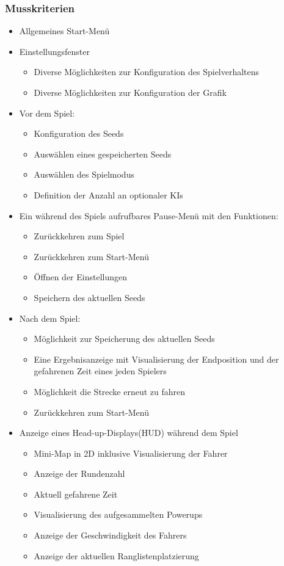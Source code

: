 \documentclass[parskip=full]{scrartcl}
\begin{document}
	\subsubsection{Musskriterien} 
	\begin{itemize}
		\item Allgemeines Start-Menü
		\item Einstellungsfenster
		\begin{itemize}
			\item Diverse Möglichkeiten zur Konfiguration des Spielverhaltens
			\item Diverse Möglichkeiten zur Konfiguration der Grafik
		\end{itemize}
		\item Vor dem Spiel:
		\begin{itemize}
			\item Konfiguration des \glspl{Seed}
			\item Auswählen eines gespeicherten \glspl{Seed}
			\item Auswählen des Spielmodus
			\item Definition der Anzahl an optionaler \glspl{KI}
		\end{itemize}
		\item Ein während des Spiels aufrufbares Pause-Menü mit den Funktionen:
		\begin{itemize}
			\item Zurückkehren zum Spiel
			\item Zurückkehren zum Start-Menü
			\item Öffnen der Einstellungen
			\item Speichern des aktuellen \glspl{Seed}
		\end{itemize}
		\item Nach dem Spiel:
		\begin{itemize}
			\item Möglichkeit zur Speicherung des aktuellen \glspl{Seed}
			\item Eine Ergebnisanzeige mit Visualisierung der Endposition und der gefahrenen Zeit eines jeden Spielers
			\item Möglichkeit die Strecke erneut zu fahren
			\item Zurückkehren zum Start-Menü
		\end{itemize}
		\pagebreak
		\item Anzeige eines Head-up-Displays(HUD) während dem Spiel
		\begin{itemize}
			\item Mini-Map in 2D inklusive Visualisierung der Fahrer
			\item Anzeige der Rundenzahl
			\item Aktuell gefahrene Zeit
			\item Visualisierung des aufgesammelten Powerups
			\item Anzeige der Geschwindigkeit des Fahrers
			\item Anzeige der aktuellen Ranglistenplatzierung
		\end{itemize}
	\end{itemize}
\end{document}
